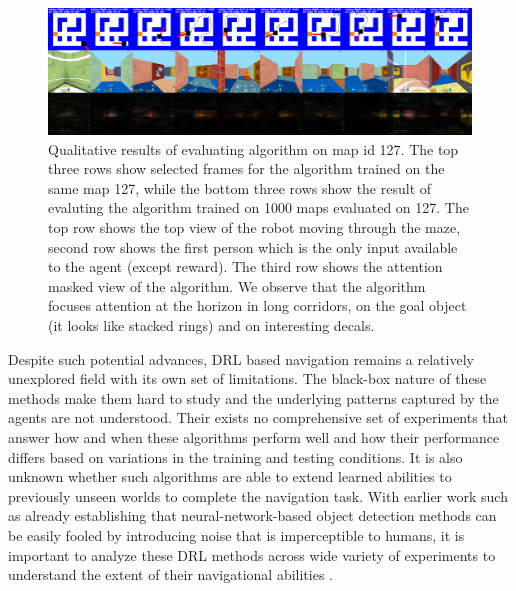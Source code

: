 \begin{figure}
\includegraphics[width=\textwidth]{./exp-results/training-09x09-0127-on-0127.png}
\caption{Qualitative results of evaluating algorithm on map id 127. The top three rows show selected frames for the algorithm trained on the same map 127, while the bottom three rows show the result of evaluting the algorithm trained on 1000 maps evaluated on 127. The top row shows the top view of the robot moving through the maze, second row shows the first person which is the only input available to the agent (except reward). The third row shows the attention masked view of the algorithm. We observe that the algorithm focuses attention at the horizon in long corridors, on the goal object (it looks like stacked rings) and on interesting decals.}
\label{fig:training-qualitative}
\end{figure}

Despite such potential advances, DRL based navigation remains a relatively unexplored field with its own set of limitations. 
The black-box nature of these methods make them hard to study and the underlying patterns captured by the agents are not understood. 
Their exists no comprehensive set of experiments that answer how and when these algorithms perform well and how their performance differs based on variations in the training and testing conditions. 
It is also unknown whether such algorithms are able to extend learned abilities to previously unseen worlds to complete the navigation task.
With earlier work such as \cite{NgYoClCVPR2015} already establishing that  neural-network-based object detection methods can be easily fooled by introducing noise that is imperceptible to humans, it is important to analyze these DRL methods across wide variety of experiments to understand the extent of their navigational abilities \cite{MiPaViICLR2017}.


